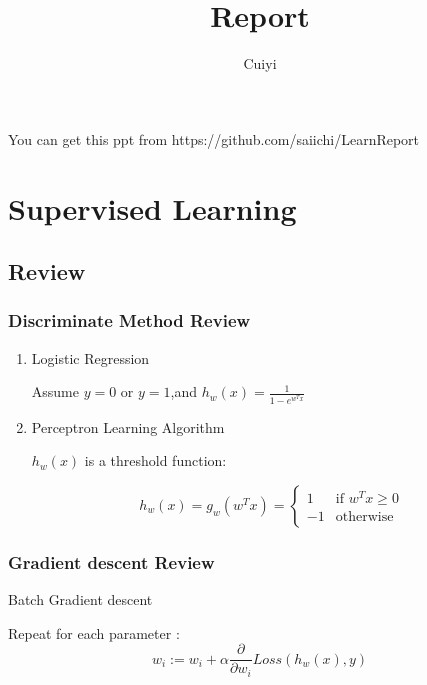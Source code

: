 \documentclass[slidestop,compress,mathserif]{beamer}
\title{Report}
\author{Cuiyi}
\institute{}
\begin{document}
\begin{frame} %
\titlepage
You can get this ppt from https://github.com/saiichi/LearnReport
\end{frame}
\section{Supervised Learning}
    \subsection{Review}
    \begin{frame}[options]
        \frametitle{Discriminate Method Review}

        \begin{enumerate}
            \item Logistic Regression

                Assume $y=0$ or $y=1$,and $h_w(x)=\frac{1}{1-e^{w^Tx}}$
            \item Perceptron Learning Algorithm

                $h_w(x)$ is a threshold function:

                $$h_w(x) = g_w(w^Tx)=\left\{
                    \begin{array}{ll}
                        1  &\mbox{if $w^Tx \ge 0$}\\
                        -1  &\mbox{otherwise}
                    \end{array}
                    \right.
                $$
        \end{enumerate}

    \end{frame}
    \begin{frame}
        \frametitle{Gradient descent Review}
        Batch Gradient descent

            Repeat for each parameter :
            $$w_i := w_i + \alpha \frac{\partial}{\partial w_i}Loss(h_w(x),y)$$
        \begin{figure}
        \end{figure}



    \end{frame}
\end{document}
